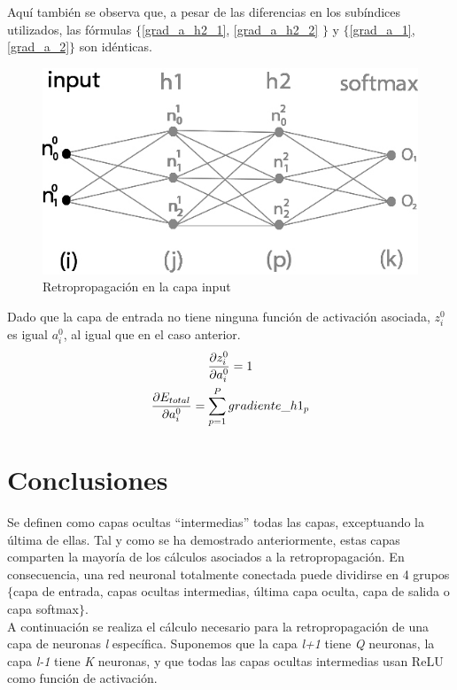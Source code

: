 Aquí también se observa que, a pesar de las diferencias en los subíndices utilizados, las fórmulas $\{$\ref{grad_a_h2_1}, \ref{grad_a_h2_2} $\}$ y $\{$\ref{grad_a_1}, \ref{grad_a_2}$\}$ son idénticas.

\begin{figure}[H]
	\centering
	\includegraphics[scale=0.35]{imagenes/nn_2_capa_input.jpg}  
	\caption{Retropropagación en la capa input}
	\label{fig:nn_2_capa_input}
\end{figure}

Dado que la capa de entrada no tiene ninguna función de activación asociada, $z^0_i$ es igual $a^0_i$, al igual que en el caso anterior. \\

\begin{gather}
	\frac{\partial z^0_i }{\partial a^0_i } = 1 \notag \\
	\frac{\partial E_{total}}{\partial a^0_i} = \sum_{p=1}^{P} gradiente\_h1_p \notag
\end{gather}

\section{Conclusiones}
Se definen como capas ocultas ``intermedias'' todas las capas, exceptuando la última de ellas. Tal y como se ha demostrado anteriormente, estas capas comparten la mayoría de los cálculos asociados a la retropropagación. En consecuencia, una red neuronal totalmente conectada puede dividirse en 4 grupos $\{$capa de entrada, capas ocultas intermedias, última capa oculta, capa de salida o capa softmax$\}$. \\
A continuación se realiza el cálculo necesario para la retropropagación de una capa de neuronas \textit{l} específica. Suponemos que la capa \textit{l+1} tiene \textit{Q} neuronas, la capa \textit{l-1} tiene \textit{K} neuronas, y que todas las capas ocultas intermedias usan ReLU como función de activación. \\

